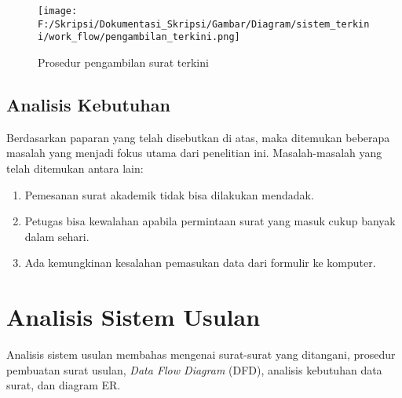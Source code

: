 \begin{figure}[H]
	\centering
		\texttt{[image: F:/Skripsi/Dokumentasi\_Skripsi/Gambar/Diagram/sistem\_terkini/work\_flow/pengambilan\_terkini.png]}
	{\caption{Prosedur pengambilan surat terkini}}
	\label{fig:pengambilan_terkini}
\end{figure}

\subsection{Analisis Kebutuhan}
\label{sec:analisis_kebutuhan}
Berdasarkan paparan yang telah disebutkan di atas, maka ditemukan beberapa masalah yang menjadi fokus utama dari penelitian ini. Masalah-masalah yang telah ditemukan antara lain:
\begin{enumerate}
	\item Pemesanan surat akademik tidak bisa dilakukan mendadak.
	\item Petugas bisa kewalahan apabila permintaan surat yang masuk cukup banyak dalam sehari.
	\item Ada kemungkinan kesalahan pemasukan data dari formulir ke komputer.
\end{enumerate}

\section{Analisis Sistem Usulan}
\label{sec:analisis_sistem_usulan}
Analisis sistem usulan membahas mengenai surat-surat yang ditangani, prosedur pembuatan surat usulan, \textit{Data Flow Diagram} (DFD), analisis kebutuhan data surat, dan diagram ER. \\

